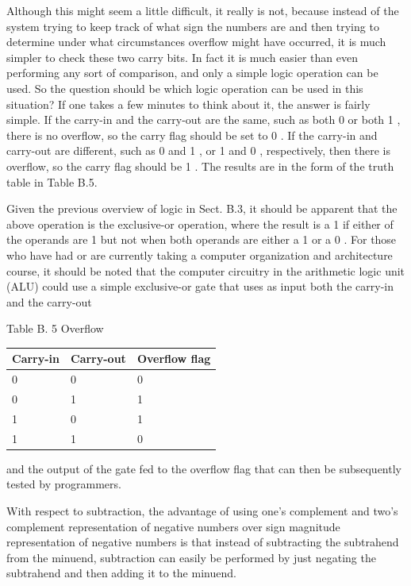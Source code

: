 \documentclass[10pt]{book}
\begin{document}
Although this might seem a little difficult, it really is not, because instead of the system trying to keep track of what sign the numbers are and then trying to determine under what circumstances overflow might have occurred, it is much simpler to check these two carry bits. In fact it is much easier than even performing any sort of comparison, and only a simple logic operation can be used. So the question should be which logic operation can be used in this situation? If one takes a few minutes to think about it, the answer is fairly simple. If the carry-in and the carry-out are the same, such as both 0 or both 1 , there is no overflow, so the carry flag should be set to 0 . If the carry-in and carry-out are different, such as 0 and 1 , or 1 and 0 , respectively, then there is overflow, so the carry flag should be 1 . The results are in the form of the truth table in Table B.5.

Given the previous overview of logic in Sect. B.3, it should be apparent that the above operation is the exclusive-or operation, where the result is a 1 if either of the operands are 1 but not when both operands are either a 1 or a 0 . For those who have had or are currently taking a computer organization and architecture course, it should be noted that the computer circuitry in the arithmetic logic unit (ALU) could use a simple exclusive-or gate that uses as input both the carry-in and the carry-out

Table B. 5 Overflow

\begin{center}
\begin{tabular}{|l|l|l|}
\hline
Carry-in & Carry-out & Overflow flag \\
\hline
0 & 0 & 0 \\
\hline
0 & 1 & 1 \\
\hline
1 & 0 & 1 \\
\hline
1 & 1 & 0 \\
\hline
\end{tabular}
\end{center}

and the output of the gate fed to the overflow flag that can then be subsequently tested by programmers.

With respect to subtraction, the advantage of using one's complement and two's complement representation of negative numbers over sign magnitude representation of negative numbers is that instead of subtracting the subtrahend from the minuend, subtraction can easily be performed by just negating the subtrahend and then adding it to the minuend.
\end{document}
